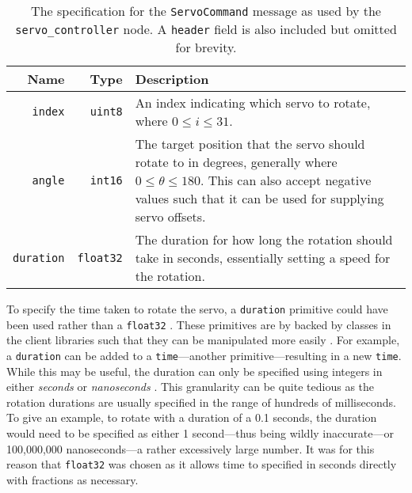 \begin{table}[!h]
	\centering
	\begin{tabular}{ r r p{10cm} }
		\toprule
		\textbf{Name} & 
		\textbf{Type} & 
		\textbf{Description} \\
		\midrule

		\texttt{index} & 
		\texttt{uint8} &
		An index indicating which servo to rotate, where $0 \leq i \leq 31$. \\
		
		\hline

		\texttt{angle} & 
		\texttt{int16} & 
		The target position that the servo should rotate to in degrees, generally where $0 \leq \theta \leq 180$. This can also accept negative values such that it can be used for supplying servo offsets. \\
		
		\hline

		\texttt{duration} &
		\texttt{float32} &
		The duration for how long the rotation should take in seconds, essentially setting a speed for the rotation. \\
		\bottomrule
	\end{tabular}
	\caption{The specification for the \texttt{ServoCommand} message as used by the \texttt{servo\_controller} node. A \texttt{header} field is also included but omitted for brevity.}
	\label{tab:servocommand_msg}
\end{table}

To specify the time taken to rotate the servo, a \texttt{duration} primitive could have been used rather than a \texttt{float32} \cite{ros_wiki_msg}. These primitives are by backed by classes in the client libraries such that they can be manipulated more easily \cite{ros_api_duration_msg}. For example, a \texttt{duration} can be added to a \texttt{time}---another primitive---resulting in a new \texttt{time}. While this may be useful, the duration can only be specified using integers in either \emph{seconds} or \emph{nanoseconds} \cite{ros_api_duration_msg}. This granularity can be quite tedious as the rotation durations are usually specified in the range of hundreds of milliseconds. To give an example, to rotate with a duration of a 0.1 seconds, the duration would need to be specified as either 1 second---thus being wildly inaccurate---or 100,000,000 nanoseconds---a rather excessively large number. It was for this reason that \texttt{float32} was chosen as it allows time to specified in seconds directly with fractions as necessary.

